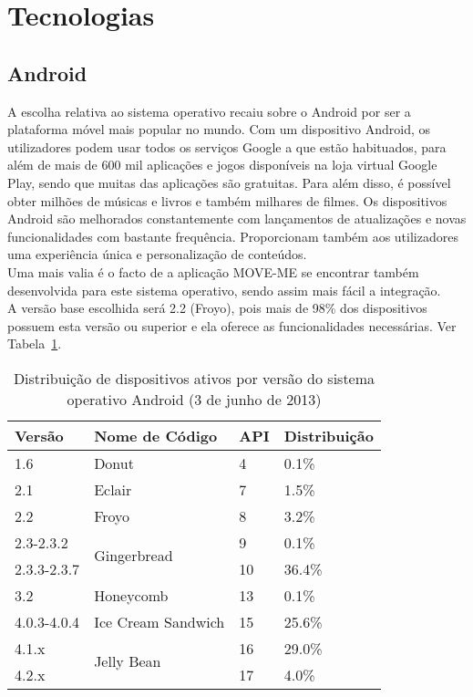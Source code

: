 \section{Tecnologias}

\subsection{Android}

A escolha relativa ao sistema operativo recaiu sobre o Android por ser a plataforma móvel mais popular no mundo. \cite{jornalnegocios} \cite{computerworld} Com um dispositivo Android, os utilizadores podem usar todos os serviços Google a que estão habituados, para além de mais de 600 mil aplicações e jogos disponíveis na loja virtual Google Play, sendo que muitas das aplicações são gratuitas. Para além disso, é possível obter milhões de músicas e livros e também milhares de filmes. Os dispositivos Android são melhorados constantemente com lançamentos de atualizações e novas funcionalidades com bastante frequência. Proporcionam também aos utilizadores uma experiência única e personalização de conteúdos.
\\Uma mais valia é o facto de a aplicação MOVE-ME se encontrar também desenvolvida para este sistema operativo, sendo assim mais fácil a integração.
\\A versão base escolhida será 2.2 (Froyo), pois mais de 98\% dos dispositivos possuem esta versão ou superior e ela oferece as funcionalidades necessárias. Ver Tabela~\ref{tab:android}.

\begin{table}[t]
  \centering
  \caption{Distribuição de dispositivos ativos por versão do sistema operativo Android (3 de junho de 2013)\cite{dashboards}}
\begin{tabular}{p{20mm} p{45mm} p{10mm} p{20mm} }
	\hline
\textbf{Versão} & \textbf{Nome de Código} & \textbf{API} & \textbf{Distribuição}\\
	\hline
	\hline
	1.6 & Donut & 4 & 0.1\%\\\hline
	2.1 & Eclair & 7 & 1.5\%\\\hline
	2.2 & Froyo & 8 & 3.2\%\\\hline
	2.3-2.3.2 & \multirow{2}{*}{Gingerbread} & 9 & 0.1\%\\
	2.3.3-2.3.7 & & 10 & 36.4\%\\\hline
	3.2 & Honeycomb & 13 & 0.1\%\\\hline
	4.0.3-4.0.4 & Ice Cream Sandwich & 15 & 25.6\%\\\hline
	4.1.x & \multirow{2}{*}{Jelly Bean} & 16 & 29.0\%\\
	4.2.x & & 17 & 4.0\%\\\hline
\end{tabular}
  \label{tab:android}
\end{table}

